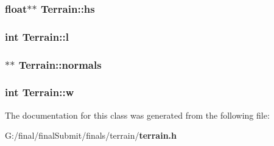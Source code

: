 \subsubsection[{hs}]{\setlength{\rightskip}{0pt plus 5cm}float$\ast$$\ast$ Terrain\-::hs}\label{class_terrain_a44c0134dcb7e92a00cf4cfbac2baf26d}
\subsubsection[{l}]{\setlength{\rightskip}{0pt plus 5cm}int Terrain\-::l}\label{class_terrain_aece05b92de564acc5251fef1538fee1b}
\subsubsection[{normals}]{$\ast$$\ast$ Terrain\-::normals}\label{class_terrain_aaac0d54d3aa227f57a2faf2e23162afb}
\subsubsection[{w}]{\setlength{\rightskip}{0pt plus 5cm}int Terrain\-::w}\label{class_terrain_a1cccccdef44cc0019b6348cdc8fc0669}


The documentation for this class was generated from the following file\-:\begin{DoxyCompactItemize}
\item 
G\-:/final/final\-Submit/finals/terrain/{\bf terrain.\-h}\end{DoxyCompactItemize}
